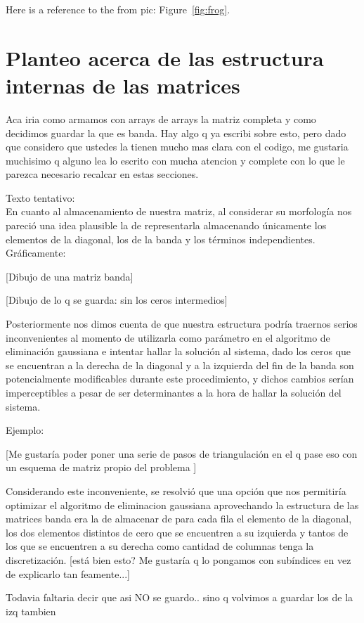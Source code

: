 \documentclass[double,12pt]{beavtex}
\begin{document}
Here is a reference to the from pic: Figure~\ref{fig:frog}.

\section{Planteo acerca de las estructura internas de las matrices}

 Aca iria como armamos con arrays de arrays la matriz completa y como decidimos guardar la que es banda. Hay algo q ya escribi sobre esto, pero dado que considero que ustedes la tienen mucho mas clara con el codigo, me gustaria muchisimo q alguno lea lo escrito con mucha atencion y complete con lo que le parezca necesario recalcar en estas secciones. \\

{\color{red}Texto tentativo: \\
En cuanto al almacenamiento de nuestra matriz, al considerar su morfolog\'ia nos pareci\'o una idea plausible la de representarla almacenando  \'unicamente los elementos de la diagonal, los de la banda y los t\'erminos independientes. Gr\'aficamente:

[Dibujo de una matriz banda]

[Dibujo de lo q se guarda: sin los ceros intermedios]

Posteriormente nos dimos cuenta de que nuestra estructura podr\'ia traernos serios inconvenientes al momento de utilizarla como par\'ametro en el algoritmo de eliminaci\'on gaussiana e intentar hallar la soluci\'on al sistema, dado los ceros que se encuentran a la derecha de la diagonal y a la izquierda del fin de la banda son potencialmente modificables durante este procedimiento, y dichos cambios ser\'ian imperceptibles a pesar de ser determinantes a la hora de hallar la soluci\'on del sistema.

Ejemplo: 

[Me gustar\'ia poder poner una serie de pasos de triangulaci\'on en el q pase eso con un esquema de matriz propio del problema ]



Considerando este inconveniente, se resolvi\'o que una opci\'on que nos permitir\'ia optimizar el algoritmo de eliminacion gaussiana aprovechando la estructura de las matrices banda era la de almacenar de para cada fila el elemento de la diagonal, los dos elementos distintos de cero que se encuentren a su izquierda y tantos de los que se encuentren a su derecha como cantidad de columnas tenga la discretizaci\'on. [est\'a bien esto? Me gustar\'ia q lo pongamos con sub\'indices en vez de explicarlo tan feamente...]

Todavia faltaria decir que asi NO se guardo.. sino q volvimos a guardar los de la izq tambien}
\end{document}
